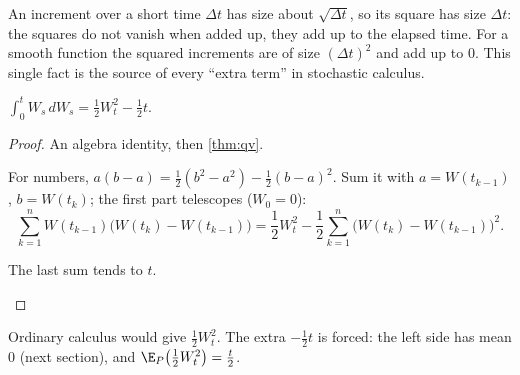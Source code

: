 \begin{intuition}
An increment over a short time $\Delta t$ has size about $\sqrt{\Delta t}$, so its square has size $\Delta t$: the squares do not vanish when added up, they add up to the elapsed time. For a smooth function the squared increments are of size $(\Delta t)^2$ and add up to $0$. This single fact is the source of every ``extra term'' in stochastic calculus.
\end{intuition}

\begin{pic}
\end{pic}

\begin{theorem}[$\int W\,dW$]
\label{thm:wdw}
$\displaystyle\int_0^tW_s\,dW_s=\frac12W_t^2-\frac12t .$
\end{theorem}
\begin{proof}
An algebra identity, then \cref{thm:qv}.
\begin{steps}
  \item For numbers, $a(b-a)=\frac12(b^2-a^2)-\frac12(b-a)^2$. Sum it with $a=W(t_{k-1})$, $b=W(t_k)$; the first part telescopes ($W_0=0$):
  \[
    \sum_{k=1}^nW(t_{k-1})\big(W(t_k)-W(t_{k-1})\big)=\frac12W_t^2-\frac12\sum_{k=1}^n\big(W(t_k)-W(t_{k-1})\big)^2 .
  \]
  \item The last sum tends to $t$. \qedhere
\end{steps}
\end{proof}

Ordinary calculus would give $\frac12W_t^2$. The extra $-\frac12t$ is forced: the left side has mean $0$ (next section), and $\E_P\big(\frac12W_t^2\big)=\frac t2$.

